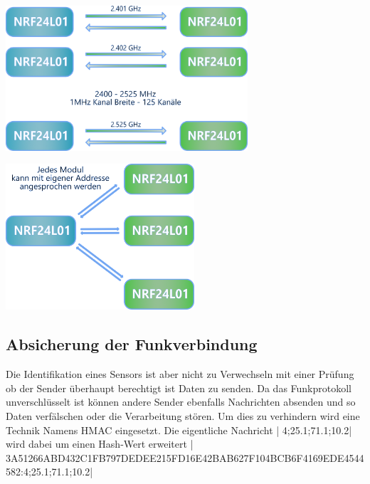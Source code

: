 \documentclass[
  12pt, %
  a4paper, %
  twoside, %
  openany, %
  numbers=noenddot, %
  BCOR=5mm, %
  parskip=half*, %
  thesis, %
]{bfhbook}
\begin{document}
\begin{center}
    \begin{minipage}[b]{0.45\textwidth}
        \centering
        \includegraphics[width=9cm]{Bilder/NRF24Kommunikation.png}
        \captionsetup{justification=centering}
    \end{minipage}\hfill
    \begin{minipage}[b]{0.45\textwidth}
        \centering
        \includegraphics[width=7cm]{Bilder/NRF24Kommunikation-2.png} %
        \captionsetup{justification=centering}
    \end{minipage}
\end{center}
\subsection{Absicherung der Funkverbindung}
Die Identifikation eines Sensors ist aber nicht zu Verwechseln mit einer Prüfung ob der Sender überhaupt berechtigt ist Daten zu senden. Da das Funkprotokoll unverschlüsselt ist können andere Sender ebenfalls Nachrichten absenden und so Daten verfälschen oder die Verarbeitung stören. Um dies zu verhindern wird eine Technik Namens \Gls{HMAC} eingesetzt.
Die eigentliche Nachricht | 4;25.1;71.1;10.2| wird dabei um einen Hash-Wert erweitert
| 3A51266ABD432C1FB797DEDEE215FD16E42BAB627F104BCB6F4169EDE4544582:4;25.1;71.1;10.2|
\end{document}
